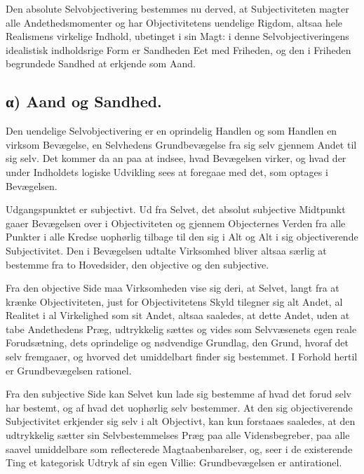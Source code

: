 \documentclass[12pt]{book}
\newcommand{\opage}[1]{\marginnote{\footnotesize\textit{[#1]}}}
\begin{document}
Den absolute Selvobjectivering bestemmes nu derved, at
Subjectiviteten magter alle Andethedsmomenter og har Objectivitetens
uendelige Rigdom, altsaa hele Realismens virkelige Indhold,
ubetinget i sin Magt: i denne Selvobjectiveringens idealistisk
indholdsrige Form er Sandheden Eet med Friheden, og den i Friheden
begrundede Sandhed at erkjende som Aand.

\subsection*{α) Aand og Sandhed.}
Den uendelige Selvobjectivering er en oprindelig Handlen og som
Handlen en virksom Bevægelse, en Selvhedens Grundbevægelse fra sig
selv gjennem Andet til sig selv. Det kommer da an paa at indsee,
hvad Bevægelsen virker, og hvad der under Indholdets logiske
Udvikling sees at foregaae med det, som optages i Bevægelsen.

Udgangspunktet er subjectivt. Ud fra Selvet, det absolut subjective
Midtpunkt gaaer Bevægelsen over i Objectiviteten og gjennem
Objecternes Verden fra alle Punkter i alle Kredse uophørlig tilbage
til den sig i Alt og Alt i sig objectiverende Subjectivitet. Den i
Bevægelsen udtalte Virksomhed bliver altsaa særlig at bestemme fra
to Hovedsider, den objective og den subjective.

Fra den objective Side maa Virksomheden vise sig deri,
\opage{78} at Selvet, langt fra at krænke Objectiviteten, just for
Objectivitetens Skyld tilegner sig alt Andet, al Realitet i al
Virkelighed som sit Andet, altsaa saaledes, at dette Andet, uden at
tabe Andethedens Præg, udtrykkelig sættes og vides som Selvvæsenets
egen reale Forudsætning, dets oprindelige og nødvendige Grundlag,
den Grund, hvoraf det selv fremgaaer, og hvorved det umiddelbart
finder sig bestemmet. I Forhold hertil er Grundbevægelsen rationel.

Fra den subjective Side kan Selvet kun lade sig bestemme af hvad det
forud selv har bestemt, og af hvad det uophørlig selv bestemmer. At
den sig objectiverende Subjectivitet erkjender sig selv i alt
Objectivt, kan kun forstaaes saaledes, at den udtrykkelig sætter sin
Selvbestemmelses Præg paa alle Vidensbegreber, paa alle saavel
umiddelbare som reflecterede Magtaabenbarelser, og, seer i de
existerende Ting et kategorisk Udtryk af sin egen Villie:
Grundbevægelsen er antirationel.
\end{document}
